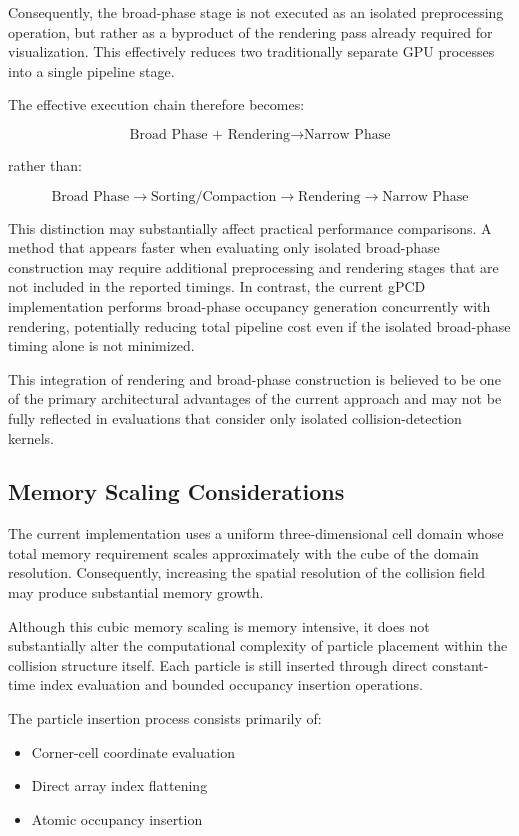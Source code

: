 \documentclass{article}
\begin{document}
Consequently, the broad-phase stage is not executed as an isolated preprocessing operation, but rather as a byproduct of the rendering pass already required for visualization. This effectively reduces two traditionally separate GPU processes into a single pipeline stage.

The effective execution chain therefore becomes:

\[
\text{Broad Phase + Rendering} \rightarrow \text{Narrow Phase}
\]

rather than:

\[
\text{Broad Phase} \rightarrow
\text{Sorting/Compaction} \rightarrow
\text{Rendering} \rightarrow
\text{Narrow Phase}
\]

This distinction may substantially affect practical performance comparisons. A method that appears faster when evaluating only isolated broad-phase construction may require additional preprocessing and rendering stages that are not included in the reported timings. In contrast, the current gPCD implementation performs broad-phase occupancy generation concurrently with rendering, potentially reducing total pipeline cost even if the isolated broad-phase timing alone is not minimized.

This integration of rendering and broad-phase construction is believed to be one of the primary architectural advantages of the current approach and may not be fully reflected in evaluations that consider only isolated collision-detection kernels.

\subsection{Memory Scaling Considerations}

The current implementation uses a uniform three-dimensional cell domain whose total memory requirement scales approximately with the cube of the domain resolution. Consequently, increasing the spatial resolution of the collision field may produce substantial memory growth.

Although this cubic memory scaling is memory intensive, it does not substantially alter the computational complexity of particle placement within the collision structure itself. Each particle is still inserted through direct constant-time index evaluation and bounded occupancy insertion operations.

The particle insertion process consists primarily of:

\begin{itemize}
    \item Corner-cell coordinate evaluation
    \item Direct array index flattening
    \item Atomic occupancy insertion
\end{itemize}
\end{document}

